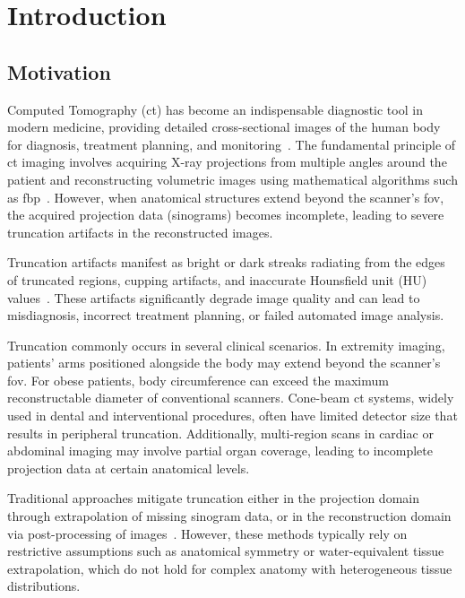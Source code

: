 \chapter{Introduction}
\label{ch:introduction}

\section{Motivation}

Computed Tomography (\gls{ct}) has become an indispensable diagnostic tool in modern medicine, providing detailed cross-sectional images of the human body for diagnosis, treatment planning, and monitoring~\cite{buzug2008computed}. The fundamental principle of \gls{ct} imaging involves acquiring X-ray projections from multiple angles around the patient and reconstructing volumetric images using mathematical algorithms such as \gls{fbp}~\cite{kak2001principles}. However, when anatomical structures extend beyond the scanner's \gls{fov}, the acquired projection data (sinograms) becomes incomplete, leading to severe truncation artifacts in the reconstructed images.

Truncation artifacts manifest as bright or dark streaks radiating from the edges of truncated regions, cupping artifacts, and inaccurate Hounsfield unit (HU) values~\cite{ohnesorge2000efficient}. These artifacts significantly degrade image quality and can lead to misdiagnosis, incorrect treatment planning, or failed automated image analysis. 

Truncation commonly occurs in several clinical scenarios. In extremity imaging, patients' arms positioned alongside the body may extend beyond the scanner's \gls{fov}. For obese patients, body circumference can exceed the maximum reconstructable diameter of conventional scanners. Cone-beam \gls{ct} systems, widely used in dental and interventional procedures, often have limited detector size that results in peripheral truncation. Additionally, multi-region scans in cardiac or abdominal imaging may involve partial organ coverage, leading to incomplete projection data at certain anatomical levels.

Traditional approaches mitigate truncation either in the projection domain through extrapolation of missing sinogram data, or in the reconstruction domain via post-processing of images~\cite{sourbelle2005reconstruction}. However, these methods typically rely on restrictive assumptions such as anatomical symmetry or water-equivalent tissue extrapolation, which do not hold for complex anatomy with heterogeneous tissue distributions.

